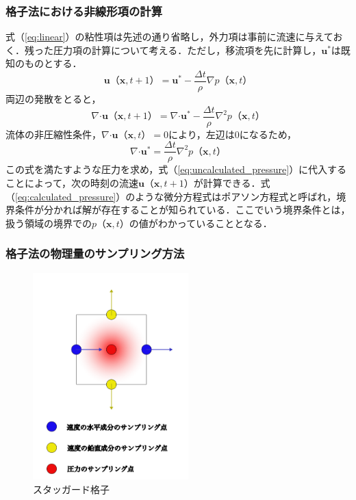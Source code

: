 \documentclass[a4j,12pt]{jreport}
\begin{document}
\subsubsection{格子法における非線形項の計算} \label{subsec:gridpressure}
式（\ref{eq:linear}）の粘性項は先述の通り省略し，外力項は事前に流速に与えておく．残った圧力項の計算について考える．ただし，移流項を先に計算し，$\bm{u}^*$は既知のものとする．
\begin{equation}\label{eq:uncalculated_pressure}
\bm{u}（\bm{x},t+1） =  \bm{u}^* - \frac{\varDelta t}{\rho}\nabla p（\bm{x},t）
\end{equation} 
両辺の発散をとると，
$$\nabla\boldsymbol{\cdot}\bm{u}（\bm{x},t+1） =  \nabla\boldsymbol{\cdot}\bm{u}^* - \frac{\varDelta t}{\rho}\nabla^2 p（\bm{x},t）$$
流体の非圧縮性条件，$\nabla\boldsymbol{\cdot}\bm{u}（\bm{x},t） = 0$により，左辺は0になるため，
\begin{equation}\label{eq:calculated_pressure}
\nabla\boldsymbol{\cdot}\bm{u}^* = \frac{\varDelta t}{\rho}\nabla^2 p（\bm{x},t）
\end{equation} 
この式を満たすような圧力を求め，式（\ref{eq:uncalculated_pressure}）に代入することによって，次の時刻の流速$\bm{u}（\bm{x},t+1）$が計算できる．式（\ref{eq:calculated_pressure}）のような微分方程式はポアソン方程式と呼ばれ，境界条件が分かれば解が存在することが知られている．ここでいう境界条件とは，扱う領域の境界での$p（\bm{x},t）$の値がわかっていることとなる．
\subsubsection{格子法の物理量のサンプリング方法} \label{subsec:grid_sampling}
\begin{figure}[htbp]
\begin{center}
\includegraphics[width=60mm]{staggerd.png}
\caption{スタッガード格子}
\end{center}
\end{figure}
\end{document}
